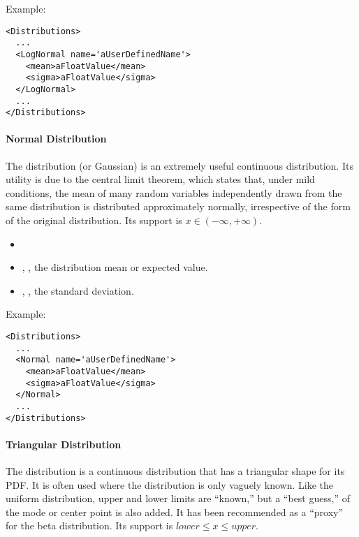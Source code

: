 Example:
\begin{lstlisting}[style=XML]
<Distributions>
  ...
  <LogNormal name='aUserDefinedName'>
    <mean>aFloatValue</mean>
    <sigma>aFloatValue</sigma>
  </LogNormal>
  ...
</Distributions>
\end{lstlisting}

\paragraph{Normal Distribution}
\label{Normal}
The  distribution (or Gaussian) is an extremely
useful continuous distribution.
%
Its utility is due to the central limit theorem, which states that, under mild
conditions, the mean of many random variables independently drawn from the same
distribution is distributed approximately normally, irrespective of the form of
the original distribution.
%
Its support is $x \in (-\infty, +\infty)$.

%
\attrIntro
\vspace{-5mm}
\begin{itemize}
  \itemsep0em
  \item \nameDescription
\end{itemize}
\vspace{-5mm}
\subnodesIntro
\begin{itemize}
  \item {}, , the distribution
  mean
  or expected value.
  \item {}, , the standard
  deviation.
\end{itemize}

Example:
\begin{lstlisting}[style=XML]
<Distributions>
  ...
  <Normal name='aUserDefinedName'>
    <mean>aFloatValue</mean>
    <sigma>aFloatValue</sigma>
  </Normal>
  ...
</Distributions>
\end{lstlisting}

\paragraph{Triangular Distribution}
\label{Triangular}
The  distribution is a continuous distribution that has a
triangular shape for its PDF.
%
It is often used where the distribution is only vaguely known.
%
Like the uniform distribution, upper and lower limits are ``known,'' but a
``best guess,'' of the mode or center point is also added.
%
It has been recommended as a ``proxy'' for the beta distribution.
%
Its support is $lower \le x \le upper$.

